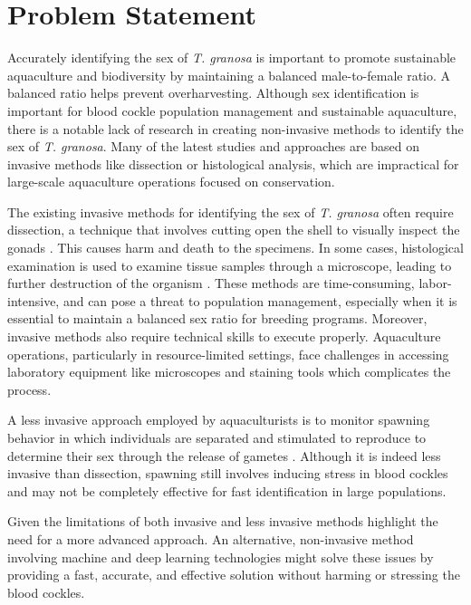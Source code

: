 \section{Problem Statement}

Accurately identifying the sex of \textit{T. granosa} is important to promote sustainable aquaculture and biodiversity by maintaining a balanced male-to-female ratio. A balanced ratio helps prevent overharvesting. Although sex identification is important for blood cockle population management and sustainable aquaculture, there is a notable lack of research in creating non-invasive methods to identify the sex of \textit{T. granosa}. Many of the latest studies and approaches are based on invasive methods like dissection or histological analysis, which are impractical for large-scale aquaculture operations focused on conservation.

The existing invasive methods for identifying the sex of \textit{T. granosa} often require dissection, a technique that involves cutting open the shell to visually inspect the gonads \cite{erica2018}. This causes harm and death to the specimens. In some cases, histological examination is used to examine tissue samples through a microscope, leading to further destruction of the organism \cite{may2021}. These methods are time-consuming, labor-intensive, and can pose a threat to population management, especially when it is essential to maintain a balanced sex ratio for breeding programs. Moreover, invasive methods also require technical skills to execute properly. Aquaculture operations, particularly in resource-limited settings, face challenges in accessing laboratory equipment like microscopes and staining tools which complicates the process.

A less invasive approach employed by aquaculturists is to monitor spawning behavior in which individuals are separated and stimulated to reproduce to determine their sex through the release of gametes \cite{miranda2023}. Although it is indeed less invasive than dissection, spawning still involves inducing stress in blood cockles and may not be completely effective for fast identification in large populations.

Given the limitations of both invasive and less invasive methods highlight the need for a more advanced approach. An alternative, non-invasive method involving machine and deep learning technologies might solve these issues by providing a fast, accurate, and effective solution without harming or stressing the blood cockles.

